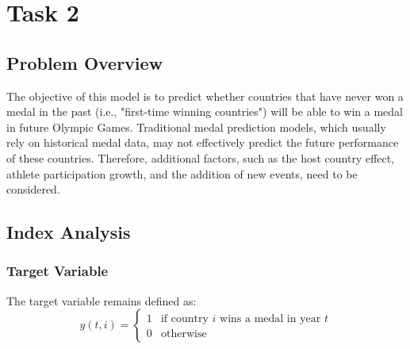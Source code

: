 \documentclass{mcmthesis}
\begin{document}
%


\section{Task 2}

\subsection{Problem Overview}
The objective of this model is to predict whether countries that have never won a medal in the past (i.e., "first-time winning countries") will be able to win a medal in future Olympic Games. Traditional medal prediction models, which usually rely on historical medal data, may not effectively predict the future performance of these countries. Therefore, additional factors, such as the host country effect, athlete participation growth, and the addition of new events, need to be considered.

\subsection{Index Analysis}

\subsubsection{Target Variable}
The target variable remains defined as:
\[
y(t,i) = 
\begin{cases} 
	1 & \text{if country } i \text{ wins a medal in year } t \\ 
	0 & \text{otherwise}
\end{cases}
\]
\end{document}
